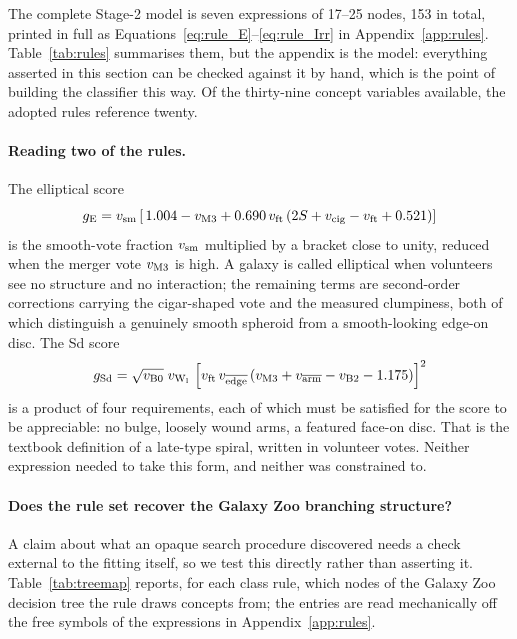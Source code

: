 \documentclass[11pt]{article}
\begin{document}
The complete Stage-2 model is seven expressions of 17--25 nodes, 153 in total,
printed in full as Equations~\eqref{eq:rule_E}--\eqref{eq:rule_Irr} in
Appendix~\ref{app:rules}. Table~\ref{tab:rules} summarises
them, but the appendix is the model: everything asserted in this section can
be checked against it by hand, which is the point of building the classifier
this way. Of the thirty-nine concept variables available, the adopted rules
reference twenty.

\paragraph{Reading two of the rules.}
The elliptical score
\begin{equation*}
g_{\rm E} = v_{\rm sm}\left[\,1.004 - v_{\rm M3}
  + 0.690\,v_{\rm ft}\left(2S + v_{\rm cig} - v_{\rm ft} + 0.521\right)\right]
\end{equation*}
is the smooth-vote fraction $v_{\rm sm}$ multiplied by a bracket close to
unity, reduced when the merger vote $v_{\rm M3}$ is high. A galaxy is called
elliptical when volunteers see no structure and no interaction; the remaining
terms are second-order corrections carrying the cigar-shaped vote and the
measured clumpiness, both of which distinguish a genuinely smooth spheroid
from a smooth-looking edge-on disc. The Sd score
\begin{equation*}
g_{\rm Sd} = \sqrt{v_{\rm B0}}\;v_{\rm W_{l}}\,
  \left[v_{\rm ft}\,v_{\overline{\rm edge}}
  \left(v_{\rm M3} + v_{\overline{\rm arm}} - v_{\rm B2} - 1.175\right)\right]^{2}
\end{equation*}
is a product of four requirements, each of which must be satisfied for the
score to be appreciable: no bulge, loosely wound arms, a featured face-on
disc. That is the textbook definition of a late-type spiral, written in
volunteer votes. Neither expression needed to take this form, and neither was
constrained to.

\paragraph{Does the rule set recover the Galaxy Zoo branching structure?}
A claim about what an opaque search procedure discovered needs a check
external to the fitting itself, so we test this directly rather than asserting
it. Table~\ref{tab:treemap} reports,
for each class rule, which nodes of the Galaxy Zoo decision tree the rule
draws concepts from; the entries are read mechanically off the free symbols of
the expressions in Appendix~\ref{app:rules}.
\end{document}
